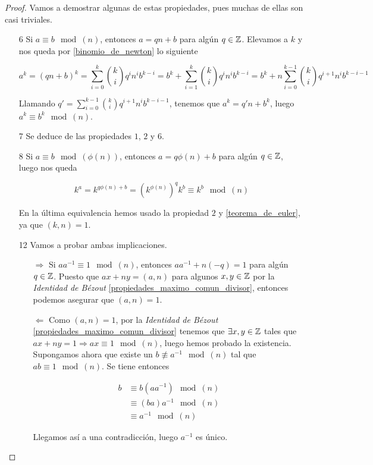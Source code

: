 \begin{proof}
	Vamos a demostrar algunas de estas propiedades, pues muchas de ellas son casi triviales.
	
	\begin{itemize}
		\item[6] Si $a \equiv b \mod(n)$, entonces $a = qn + b$ para algún $q \in \mathbb{Z}$. Elevamos a $k$ y nos queda por \autoref{binomio_de_newton} lo siguiente
		
		\[ a^k = (qn + b)^k = \sum_{i=0}^{k}\binom{k}{i}q^in^ib^{k-i} = b^k + \sum_{i=1}^{k}\binom{k}{i}q^in^ib^{k-i} = b^k + n\sum_{i=0}^{k-1}\binom{k}{i}q^{i+1}n^ib^{k-i-1} \]
		
		Llamando $q' = \sum_{i=0}^{k-1}\binom{k}{i}q^{i+1}n^ib^{k-i-1}$, tenemos que $a^k = q'n + b^k$, luego $a^k \equiv b^k \mod(n)$.
		
		\item[7] Se deduce de las propiedades $1$, $2$ y $6$.
		
		\item[8] Si $a \equiv b \mod(\phi(n))$, entonces $a = q\phi(n) + b$ para algún $q \in \mathbb{Z}$, luego nos queda
		
		\begin{equation}
		k^a = k^{q\phi(n) + b} = \left(k^{\phi(n)}\right)^qk^b \equiv k^b \mod(n)
		\end{equation} 
		
		En la última equivalencia hemos usado la propiedad $2$ y \autoref{teorema_de_euler}, ya que $(k, n) = 1$.
		
		\item[12] Vamos a probar ambas implicaciones.
		
		\begin{itemize}
			\item[$\Rightarrow$] Si $aa^{-1} \equiv 1 \mod(n)$, entonces $aa^{-1} + n(-q) = 1$ para algún $q \in \mathbb{Z}$. Puesto que $ax+ny = (a, n)$ para algunos $x, y \in \mathbb{Z}$ por la \textit{Identidad de Bézout} \ref{propiedades_maximo_comun_divisor}, entonces podemos asegurar que $(a, n) = 1$.
			
			\item[$\Leftarrow$] Como $(a, n) = 1$, por la \textit{Identidad de Bézout} \ref{propiedades_maximo_comun_divisor} tenemos que $\exists x,y \in \mathbb{Z}$ tales que $ax + ny = 1 \Rightarrow ax \equiv 1 \mod(n)$, luego hemos probado la existencia.\\
			
			Supongamos ahora que existe un $b \not\equiv a^{-1} \mod(n)$ tal que $ab \equiv 1 \mod(n)$. Se tiene entonces
			
			\begin{align}
			b &\equiv b(aa^{-1}) \mod(n)\\
			&\equiv (ba)a^{-1} \mod(n)\\
			&\equiv a^{-1} \mod(n)
			\end{align}
			
			Llegamos así a una contradicción, luego $a^{-1}$ es único.
		\end{itemize}
	\end{itemize}
\end{proof}

